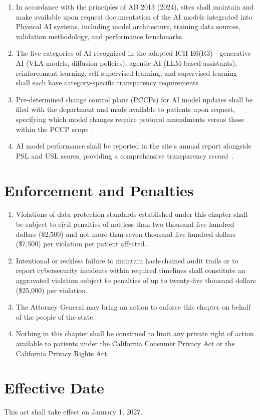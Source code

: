 \documentclass[11pt,letterpaper]{article}
\begin{document}
\begin{enumerate}[label=(\alph*)]
\item In accordance with the principles of AB 2013 (2024), sites shall maintain
  and make available upon request documentation of the AI models integrated
  into Physical AI systems, including model architecture, training data
  sources, validation methodology, and performance benchmarks.

\item The five categories of AI recognized in the adapted ICH E6(R3) -
  generative AI (VLA models, diffusion policies), agentic AI (LLM-based
  assistants), reinforcement learning, self-supervised learning, and
  supervised learning - shall each have category-specific transparency
  requirements~\cite{iche6r3adapt}.

\item Pre-determined change control plans (PCCPs) for AI model updates shall be
  filed with the department and made available to patients upon request,
  specifying which model changes require protocol amendments versus those
  within the PCCP scope~\cite{cfr312adapt}.

\item AI model performance shall be reported in the site's annual report
  alongside PSL and USL scores, providing a comprehensive transparency
  record~\cite{cfr312adapt}.
\end{enumerate}

\section{Enforcement and Penalties}

\begin{enumerate}[label=(\alph*)]
\item Violations of data protection standards established under this chapter
  shall be subject to civil penalties of not less than two thousand five
  hundred dollars (\$2,500) and not more than seven thousand five hundred
  dollars (\$7,500) per violation per patient affected.

\item Intentional or reckless failure to maintain hash-chained audit trails or
  to report cybersecurity incidents within required timelines shall constitute
  an aggravated violation subject to penalties of up to twenty-five thousand
  dollars (\$25,000) per violation.

\item The Attorney General may bring an action to enforce this chapter on behalf
  of the people of the state.

\item Nothing in this chapter shall be construed to limit any private right of
  action available to patients under the California Consumer Privacy Act or
  the California Privacy Rights Act.
\end{enumerate}

\section{Effective Date}

This act shall take effect on January 1, 2027.

\printbibliography[title={References}]
\end{document}
